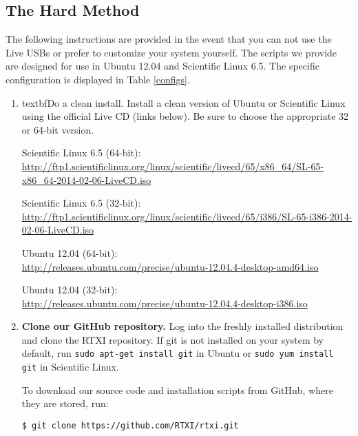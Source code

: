 \subsection{The Hard Method}
\label{manualinstall} 

The following instructions are provided in the event that you can not use the Live USBs or prefer to customize your system yourself. The scripts we provide are designed for use in Ubuntu 12.04 and Scientific Linux 6.5. The specific configuration is displayed in Table \ref{configs}.


\begin{enumerate}
\item textbf{Do a clean install.} Install a clean version of Ubuntu or Scientific Linux using the official Live CD (links below). Be sure to choose the appropriate 32 or 64-bit version.

Scientific Linux 6.5 (64-bit):\\
\url{http://ftp1.scientificlinux.org/linux/scientific/livecd/65/x86\_64/SL-65-x86\_64-2014-02-06-LiveCD.iso}

Scientific Linux 6.5 (32-bit):\\
\url{http://ftp1.scientificlinux.org/linux/scientific/livecd/65/i386/SL-65-i386-2014-02-06-LiveCD.iso}

Ubuntu 12.04 (64-bit):\\
\url{http://releases.ubuntu.com/precise/ubuntu-12.04.4-desktop-amd64.iso}

Ubuntu 12.04 (32-bit):\\
\url{http://releases.ubuntu.com/precise/ubuntu-12.04.4-desktop-i386.iso}

\item \textbf{Clone our GitHub repository.} Log into the freshly installed distribution and clone the RTXI repository. If git is not installed on your system by default, run \texttt{sudo apt-get install git} in Ubuntu or \texttt{sudo yum install git} in Scientific Linux.

To download our source code and installation scripts from GitHub, where they are stored, run:

\begin{verbatim}
$ git clone https://github.com/RTXI/rtxi.git
\end{verbatim}


\end{enumerate}
